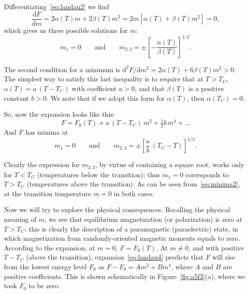 \documentclass[11pt,a4paper]{article}
\begin{document}
Differentiating~\eqref{eq:landau2} we find
\begin{equation}
  \frac{\mathrm{d}F}{\mathrm{d}m}
    = 2\alpha(T)m + 2\beta(T)m^{3}
    = 2m\left[\alpha(T) + \beta(T)m^{2}\right] = 0,
\end{equation}
which gives us three possible solutions for $m$:
\begin{equation}\label{eq:minima1}
  m_1 = 0
  \qquad\text{and}\qquad
  m_{2,3} = \pm\left[-\frac{\alpha(T)}{\beta(T)}\right]^{1/2}.
\end{equation}

The second condition for a minimum is
$\mathrm{d}^2F/\mathrm{d}m^2 = 2\alpha(T) + 6\beta(T)m^2 > 0$. The simplest way to
satisfy this last inequality is to require that at $T > T_C$,
$\alpha(T) = a\,(T - T_C)$ with coefficient $a > 0$, and that $\beta(T)$ is a
positive constant $b > 0$. We note that if we adopt this form for $\alpha(T)$,
then $\alpha(T_C) = 0$.

So, now the expansion looks like this:
\begin{equation}\label{eq:landau4}
  F = F_0(T) + a\,(T - T_C)\,m^{2} + \tfrac{1}{2}b\,m^{4} + \dots
\end{equation}
And $F$ has minima at
\begin{equation}\label{eq:minima2}
  m_1 = 0
  \qquad\text{and}\qquad
  m_{2,3} = \pm\left[\frac{a}{b}\,(T_C - T)\right]^{1/2}.
\end{equation}

Clearly the expression for $m_{2,3}$, by virtue of containing a square root, works
only for $T < T_C$ (temperatures below the transition); thus $m_1 = 0$ corresponds
to $T > T_C$ (temperatures above the transition). As can be seen
from~\eqref{eq:minima2}, at the transition temperature $m = 0$ in both cases.

Now we will try to explore the physical consequences. Recalling the physical
meaning of $m$, we see that equilibrium magnetization (or polarization) is zero at
$T > T_C$: this is clearly the description of a paramagnetic (paraelectric) state,
in which magnetization from randomly-oriented magnetic moments equals to zero. According to the expansion, at $m = 0$, $F = F_0(T)$. At
$m \ne 0$, and with positive $T - T_C$ (above the transition),
expansion~\eqref{eq:landau4} predicts that $F$ will rise from the lowest energy
level $F_0$ as $F - F_0 = Am^2 + Bm^4$, where $A$ and $B$ are positive
coefficients. This is shown schematically in Figure~\ref{fig:a5f3}(a), where we
took $F_0$ to be zero.
\end{document}

